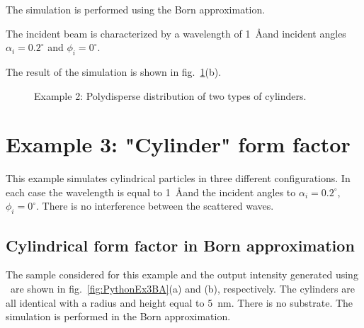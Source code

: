 The simulation is performed using the Born approximation.

The incident beam is characterized by a wavelength of 1~\AA and incident angles
$\alpha_i=0.2^{\circ}$ and $\phi_i=0^{\circ}$.

The result of the simulation is shown in fig.~\ref{fig:PythonEx2}(b). 


\begin{figure}[H]
\hfill
{}
\hfill
{}
\hfill
\caption{Example 2: Polydisperse distribution of two types of cylinders.}
\label{fig:PythonEx2}
\end{figure}


\newpage
\section{Example 3: "Cylinder" form factor}
This example simulates cylindrical particles in three different configurations.
In each case the wavelength is equal to 1~\AA and the incident angles to $\alpha_i=0.2^{\circ}$, $\phi_i=0^{\circ}$. There is no interference between the scattered waves.

\subsection{Cylindrical form factor in Born approximation} \label{sec:ex003CylinderBA}
The sample considered for this example and the output intensity generated using \BornAgain\ are shown in fig.~\ref{fig:PythonEx3BA}(a) and (b), respectively. The cylinders are all identical with a radius and height equal to 5~nm. There is no substrate. The simulation is performed in the Born approximation.


